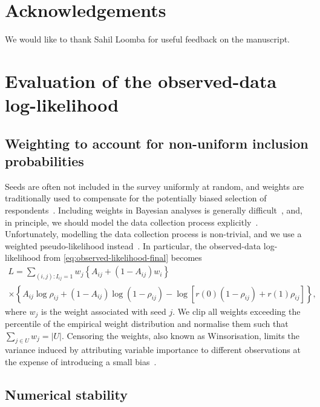 \documentclass{scrartcl}
\newcommand{\card}[1]{\left|#1\right|}
\newcommand{\seeds}{U}
\begin{document}
\section*{Acknowledgements}

We would like to thank Sahil Loomba for useful feedback on the manuscript.

\printbibliography

\appendix
{}

\section{Evaluation of the observed-data log-likelihood}

\subsection{Weighting to account for non-uniform inclusion probabilities}

Seeds are often not included in the survey uniformly at random, and weights are traditionally used to compensate for the potentially biased selection of respondents~\cite{Kish1992}. Including weights in Bayesian analyses is generally difficult~\cite{Gelman2007}, and, in principle, we should model the data collection process explicitly~\cite[chapter~8]{Gelman2013}. Unfortunately, modelling the data collection process is non-trivial, and we use a weighted pseudo-likelihood instead~\cite{Pfeffermann1996}. In particular, the observed-data log-likelihood from \cref{eq:observed-likelihood-final} becomes
\begin{multline}
    L = \sum_{(i,j):I_{ij} = 1} w_j\left\{A_{ij} + (1 - A_{ij})w_i\right\}
    \\\times\left\{A_{ij}\log\rho_{ij} + (1-A_{ij})\log(1-\rho_{ij})-\log\left[r(0)(1 - \rho_{ij}) + r(1)\rho_{ij}\right]\right\},\label{eq:survey-weighted-log-likelihood}
\end{multline}
where $w_j$ is the weight associated with seed $j$. We clip all weights exceeding the  percentile of the empirical weight distribution and normalise them such that $\sum_{j\in\seeds}w_j=\card{\seeds}$. Censoring the weights, also known as Winsorisation, limits the variance induced by attributing variable importance to different observations at the expense of introducing a small bias~\cite{Kish1992}.

\subsection{Numerical stability\label{app:numeric-stability}}
\end{document}
